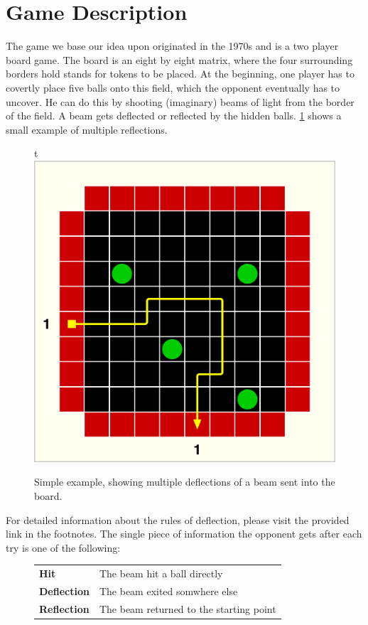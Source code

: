 \documentclass[conference]{IEEEtran}
\begin{document}
\section{Game Description}
The game we base our idea upon originated in the 1970s and is a two player board game. 
The board is an eight by eight matrix, where the four surrounding borders hold stands for tokens to be placed. 
At the beginning, one player has to covertly place five balls onto this field, which the opponent eventually has to uncover. 
He can do this by shooting (imaginary) beams of light from the border of the field. 
A beam gets deflected or reflected by the hidden balls. 
\cref{fig:deflection} shows a small example of multiple reflections.
\begin{figure}{t}
    \centering
    \includegraphics[width=\linewidth]{img/BlackBoxSample8.pdf}
    \vspace{-1em}
    \caption{Simple example, showing multiple deflections of a beam sent into the board.}
    \label{fig:deflection}
    \vspace{-1em}
\end{figure}
For detailed information about the rules of deflection, please visit the provided link in the footnotes. 
The single piece of information the opponent gets after each try is one of the following:
\begin{figure}[H]
    \centering
    \begin{tabular}{l l}
        \textbf{Hit} & The beam hit a ball directly \\
        \textbf{Deflection} & The beam exited somwhere else \\
        \textbf{Reflection} & The beam returned to the starting point
    \end{tabular}
\end{figure}
\end{document}
